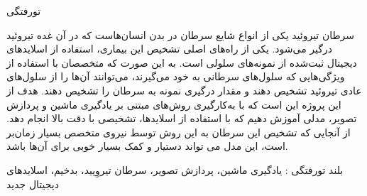 

\pagestyle{empty}

‌تورفتگی

سرطان تیروئید یکی از انواع شایع سرطان در بدن انسان‌هاست که در آن غده تیروئید درگیر می‌شود.
یکی از راه‌های اصلی تشخیص این بیماری، استفاده از اسلاید‌های دیجیتال ثبت‌شده از نمونه‌‌های سلولی است.
به این صورت که متخصصان با استفاده از ویژگی‌هایی که سلول‌های سرطانی به خود می‌گیرند، می‌توانند آن‌ها را از سلول‌های عادی تیروئید تشخیص دهند و مقدار درگیری نمونه به سرطان را تشخیص دهند.
هدف از این پروژه این است که با به‌کارگیری روش‌های مبتنی بر یادگیری ماشین و پردازش تصویر، مدلی آموزش دهیم که با استفاده از اسلاید‌ها، تشخیصی با دقت بالا انجام دهد. از آنجایی که تشخیص این سرطان به این روش توسط نیروی متخصص بسیار زمان‌بر است، این مدل می تواند دستیار و کمک بسیار خوبی برای آن‌ها باشد.

‌بلند
‌تورفتگی :
یادگیری ماشین، پردازش تصویر، سرطان تیروِیید، بدخیم، اسلاید‌های دیجیتال
‌جدید
